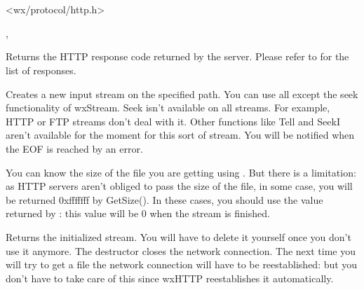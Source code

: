 \section{}\label{wxhttp}




<wx/protocol/http.h>


, 


\label{wxhttpgetresponse}


Returns the HTTP response code returned by the server. Please refer to
 for the list of responses.


\label{wxhttpgetinputstream}


Creates a new input stream on the specified path. You can use all except the seek
functionality of wxStream. Seek isn't available on all streams. For example,
HTTP or FTP streams don't deal with it. Other functions like Tell and SeekI
aren't available for the moment for this sort of stream.
You will be notified when the EOF is reached by an error.


You can know the size of the file you are getting using .
But there is a limitation: as HTTP servers aren't obliged to pass the size of
the file, in some case, you will be returned 0xfffffff by GetSize(). In these
cases, you should use the value returned by :
this value will be 0 when the stream is finished.


Returns the initialized stream. You will have to delete it yourself once you
don't use it anymore. The destructor closes the network connection.
The next time you will try to get a file the network connection will have
to be reestablished: but you don't have to take care of this since wxHTTP reestablishes it automatically.

